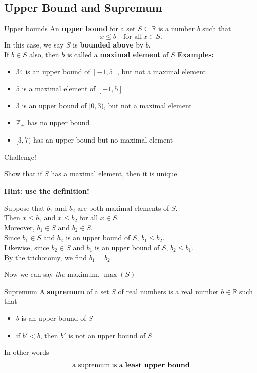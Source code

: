 \documentclass{beamer}
\begin{document}
\subsection{Upper Bound and Supremum}

\begin{frame}{Upper bounds}
An \textbf{upper bound} for a set $S\subseteq\mathbb{R}$ is a number $b$ such that
$$x \leq b\quad\text{for all}\ x\in S.$$
\pause
In this case, we say $S$ is \textbf{bounded above} by $b$.\\
\pause
If $b\in S$ also, then $b$ is called a \textbf{maximal element} of $S$
\pause
\textbf{Examples:}
\begin{itemize}
\pause
\item $34$ is an upper bound of $[-1,5]$, but not a maximal element
\pause
\item $5$ is a maximal element of $[-1,5]$
\pause
\item $3$ is an upper bound of $[0,3)$, but not a maximal element
\pause
\item $\mathbb{Z}_+$ has no upper bound
\pause
\item $[3,7)$ has an upper bound but no maximal element
\end{itemize}
\end{frame}


\begin{frame}{Challenge!}
\begin{prob}
Show that if $S$ has a maximal element, then it is unique.
\end{prob}
\pause
\textbf{Hint: use the definition!}
\pause
\begin{soln}
Suppose that $b_1$ and $b_2$ are both maximal elements of $S$.\\
\pause
Then $x\leq b_1$ and $x\leq b_2$ for all $x\in S$.\\
\pause
Moreover, $b_1\in S$ and $b_2\in S$.\\
\pause
Since $b_1\in S$ and $b_2$ is an upper bound of $S$, $b_1\leq b_2$.\\
\pause
Likewise, since $b_2\in S$ and $b_1$ is an upper bound of $S$, $b_2\leq b_1$.\\
\pause
By the trichotomy, we find $b_1=b_2$.
\end{soln}
\pause
Now we can say \emph{the} maximum, $\max(S)$
\end{frame}

\begin{frame}{Supremum}
A \textbf{supremum} of a set $S$ of real numbers is a real number $b\in\mathbb{R}$ such that
\begin{itemize}
\item $b$ is an upper bound of $S$
\item if $b'<b$, then $b'$ is not an upper bound of $S$
\end{itemize}
\pause
In other words
$$\text{a supremum is a \bf{least upper bound}}$$
\end{frame}
\end{document}
